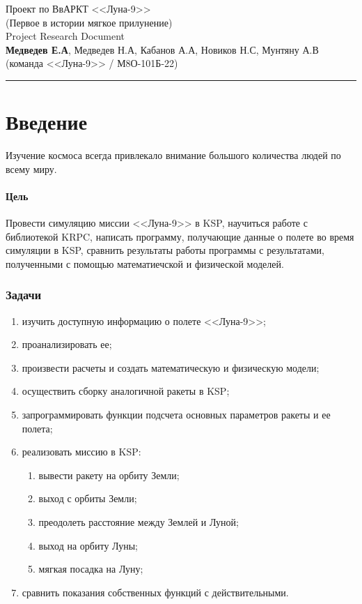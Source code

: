 


\begin{center}
	\huge{Проект по ВвАРКТ <<Луна-9>>} \\
	\large{(Первое в истории мягкое прилунение)} \\
	\Large{Project Research Document}\\
	\large{\textbf{Медведев Е.А}, Медведев Н.А, Кабанов А.А, Новиков Н.С, Мунтяну А.В} \\
	\large{(команда <<Луна-9>> / М8О-101Б-22)}
	\rule{\textwidth}{0.1pt}
\end{center}

\section*{Введение}
Изучение космоса всегда привлекало внимание большого количества людей по всему миру. 
\paragraph{Цель} Провести симуляцию миссии <<Луна-9>> в KSP, научиться работе с библиотекой KRPC, написать программу, получающие данные о полете во время симуляции в KSP, сравнить результаты работы программы с результатами, полученными с помощью математиечской и физической моделей.
\subsubsection*{Задачи}
\begin{enumerate}
	\item изучить доступную информацию о полете <<Луна-9>>;
	\item проанализировать ее;
	\item произвести расчеты и создать математическую и физическую модели;
	\item осуществить сборку аналогичной ракеты в KSP;
	\item запрограммировать функции подсчета основных параметров ракеты и ее полета;
	\item реализовать миссию в KSP:
	\begin{enumerate}
		\item вывести ракету на орбиту Земли;
		\item выход с орбиты Земли;
		\item преодолеть расстояние между Землей и Луной;
		\item выход на орбиту Луны;
		\item мягкая посадка на Луну;
	\end{enumerate}
	\item сравнить показания собственных функций с действительными.
\end{enumerate}


